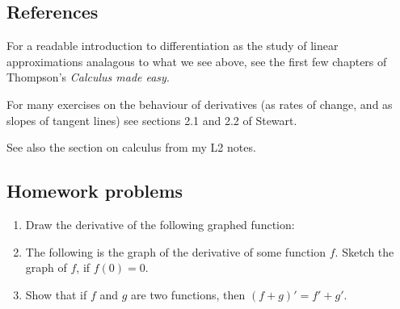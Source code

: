 \subsection{References}
For a readable introduction to differentiation as the study of linear approximations analagous
to what we see above, see the first few chapters of Thompson's \emph{Calculus made easy}.

For many exercises on the behaviour of derivatives (as rates of change, and as slopes of tangent
lines) see sections 2.1 and 2.2 of Stewart.

See also the section on calculus from my L2 notes.

\subsection{Homework problems}
\begin{enumerate}
  \item Draw the derivative of the following graphed function:
        \begin{center}
        \end{center}
  \item The following is the graph of the derivative of some function $ f $. Sketch the graph of $ f $, if $ f(0) = 0 $.
        \begin{center}
        \end{center}
  \item Show that if $ f $ and $ g $ are two functions, then $ (f + g)' = f' + g' $.
\end{enumerate}
